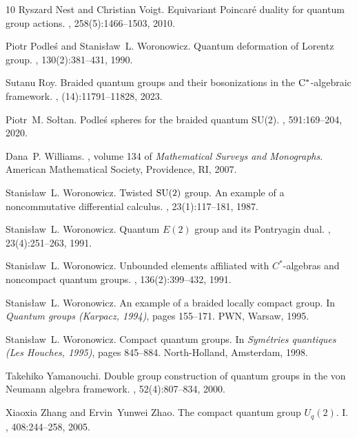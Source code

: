 \documentclass[12pt,reqno,a4paper]{amsart}
\theoremstyle{definition}
\numberwithin{equation}{section}
\begin{document}
\begin{thebibliography}{10}
Ryszard Nest and Christian Voigt.
\newblock Equivariant {P}oincar\'{e} duality for quantum group actions.
, 258(5):1466--1503, 2010.

Piotr Podle\'{s} and Stanis{\l}aw~L. Woronowicz.
\newblock Quantum deformation of {L}orentz group.
, 130(2):381--431, 1990.

Sutanu Roy.
\newblock Braided quantum groups and their bosonizations in the {$\rm
  C^*$}-algebraic framework.
, (14):11791--11828, 2023.

Piotr~M. So{\l}tan.
\newblock Podle\'{s} spheres for the braided quantum {SU}(2).
, 591:169--204, 2020.

Dana~P. Williams.
, volume 134 of {\em
  Mathematical Surveys and Monographs}.
\newblock American Mathematical Society, Providence, RI, 2007.

Stanis{\l}aw~L. Woronowicz.
\newblock Twisted {${\rm SU}(2)$} group. {A}n example of a noncommutative
  differential calculus.
, 23(1):117--181, 1987.

Stanis{\l}aw~L. Woronowicz.
\newblock Quantum {$E(2)$} group and its {P}ontryagin dual.
, 23(4):251--263, 1991.

Stanis{\l}aw~L. Woronowicz.
\newblock Unbounded elements affiliated with {$C^*$}-algebras and noncompact
  quantum groups.
, 136(2):399--432, 1991.

Stanis{\l}aw~L. Woronowicz.
\newblock An example of a braided locally compact group.
\newblock In {\em Quantum groups ({K}arpacz, 1994)}, pages 155--171. PWN,
  Warsaw, 1995.

Stanis{\l}aw~L. Woronowicz.
\newblock Compact quantum groups.
\newblock In {\em Sym\'{e}tries quantiques ({L}es {H}ouches, 1995)}, pages
  845--884. North-Holland, Amsterdam, 1998.

Takehiko Yamanouchi.
\newblock Double group construction of quantum groups in the von {N}eumann
  algebra framework.
, 52(4):807--834, 2000.

Xiaoxia Zhang and Ervin~Yunwei Zhao.
\newblock The compact quantum group {$U_q(2)$}. {I}.
, 408:244--258, 2005.

\end{thebibliography}
\end{document}
